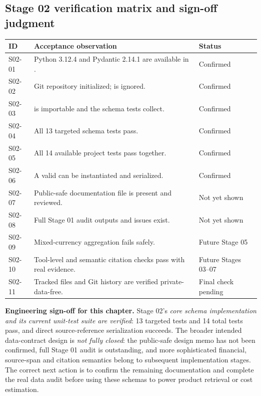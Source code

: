 \documentclass[11pt,a4paper]{article}
\DeclareRobustCommand{\code}[1]{{\ttfamily\small\detokenize{#1}}}
\begin{document}
\subsection{Stage 02 verification matrix and sign-off judgment}
\begin{tabularx}{\textwidth}{@{}L{10mm}L{101mm}Y@{}}
\toprule\textbf{ID} & \textbf{Acceptance observation} & \textbf{Status}\\\midrule
S02-01 & Python 3.12.4 and Pydantic 2.14.1 are available in \code{.venv}. & Confirmed\\
S02-02 & Git repository initialized; \code{raw/} is ignored. & Confirmed\\
S02-03 & \code{schemas.py} is importable and the schema tests collect. & Confirmed\\
S02-04 & All 13 targeted schema tests pass. & Confirmed\\
S02-05 & All 14 available project tests pass together. & Confirmed\\
S02-06 & A valid \code{SourceRef} can be instantiated and serialized. & Confirmed\\
S02-07 & Public-safe documentation file is present and reviewed. & Not yet shown\\
S02-08 & Full Stage 01 audit outputs and issues exist. & Not yet shown\\
S02-09 & Mixed-currency aggregation fails safely. & Future Stage 05\\
S02-10 & Tool-level and semantic citation checks pass with real evidence. & Future Stages 03--07\\
S02-11 & Tracked files and Git history are verified private-data-free. & Final check pending\\
\bottomrule
\end{tabularx}

\begin{keybox}
\textbf{Engineering sign-off for this chapter.} Stage 02's \emph{core schema implementation and its current unit-test suite are verified}: 13 targeted tests and 14 total tests pass, and direct source-reference serialization succeeds. The broader intended data-contract design is \emph{not fully closed}: the public-safe design memo has not been confirmed, full Stage 01 audit is outstanding, and more sophisticated financial, source-span and citation semantics belong to subsequent implementation stages. The correct next action is to confirm the remaining documentation and complete the real data audit before using these schemas to power product retrieval or cost estimation.
\end{keybox}
\end{document}
